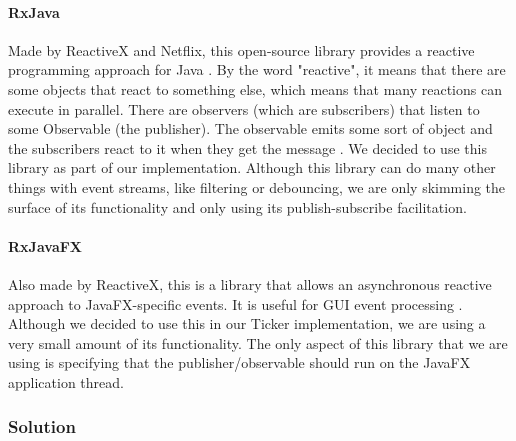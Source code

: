 \documentclass[a4paper,11pt,titlepage]{article}
\begin{document}
\paragraph{RxJava}
Made by ReactiveX and Netflix, this open-source library provides a reactive programming approach for Java \cite{rxjava}. By the word "reactive", it means that there are some objects that react to something else, which means that many reactions can execute in parallel. There are observers (which are subscribers) that listen to some Observable (the publisher). The observable emits some sort of object and the subscribers react to it when they get the message \cite{reactivex}. We decided to use this library as part of our implementation. Although this library can do many other things with event streams, like filtering or debouncing, we are only skimming the surface of its functionality and only using its publish-subscribe facilitation.
\paragraph{RxJavaFX}
Also made by ReactiveX, this is a library that allows an asynchronous reactive approach to JavaFX-specific events. It is useful for GUI event processing \cite{rxjavafx}. Although we decided to use this in our Ticker implementation, we are using a very small amount of its functionality. The only aspect of this library that we are using is specifying that the publisher/observable should run on the JavaFX application thread.

\subsubsection{Solution}
\end{document}
